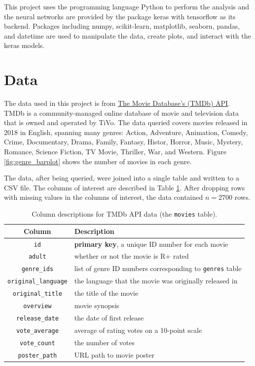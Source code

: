 \documentclass[12pt, oneside]{article}   	%
\begin{document}
This project uses the programming language Python to perform the analysis and the neural networks are provided by the package keras with tensorflow as its backend. Packages including numpy, scikit-learn, matplotlib, seaborn, pandas, and datetime are used to manipulate the data, create plots, and interact with the keras models.

\section{Data}

The data used in this project is from \href{https://api.tmdb.org}{The Movie Database's (TMDb) API}. TMDb is a community-managed online database of movie and television data that is owned and operated by TiVo. The data queried covers movies released in 2018 in English, spanning many genres: Action, Adventure, Animation, Comedy, Crime, Documentary, Drama, Family, Fantasy, Histor, Horror, Music, Mystery, Romance, Science Fiction, TV Movie, Thriller, War, and Western. Figure \ref{fig:genre_barplot} shows the number of movies in each genre.

The data, after being queried, were joined into a single table and written to a CSV file. The columns of interest are described in Table \ref{table:cols_of_interest}. After dropping rows with missing values in the columns of interest, the data contained $n=2700$ rows.

\begin{table}
\begin{center}\begin{tabular}{c|l}
\textbf{Column} & \textbf{Description} \\ \hline
\texttt{id} & \textbf{primary key}, a unique ID number for each movie \\
\texttt{adult} & whether or not the movie is R+ rated \\
\texttt{genre\_ids} & list of genre ID numbers corresponding to \texttt{genres} table \\
\texttt{original\_language} & the language that the movie was originally released in \\
\texttt{original\_title} & the title of the movie \\
\texttt{overview} & movie synopsis \\
\texttt{release\_date} & the date of first release \\
\texttt{vote\_average} & average of rating votes on a 10-point scale \\
\texttt{vote\_count} & the number of votes \\
\texttt{poster\_path} & URL path to movie poster \\
\end{tabular}\end{center}
\caption{\label{table:cols_of_interest}Column descriptions for TMDb API data (the \texttt{movies} table).}
\end{table}
\end{document}
